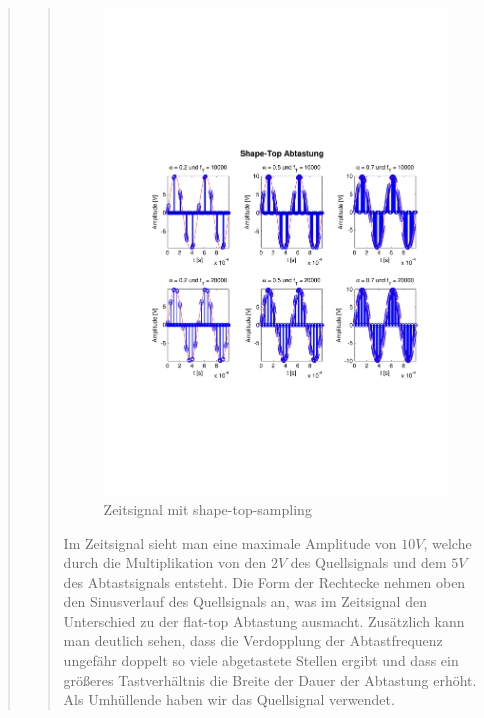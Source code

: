 \begin{quote}
\begin{quote}
         \begin{figure}[H]
        \centering
        \includegraphics[scale=0.6, trim = 1.5cm 6cm 1cm 8cm,
        clip]{./Bilder/shape-top-zeit_5V}
            \caption{Zeitsignal mit shape-top-sampling}
  	    \end{figure}
  	    
  	    Im Zeitsignal sieht man eine maximale Amplitude von $10V$, welche durch
  	    die Multiplikation von den $2V$ des Quellsignals und dem $5V$ des
  	    Abtastsignals entsteht. Die Form der Rechtecke nehmen oben den
  	    Sinusverlauf des Quellsignals an, was im Zeitsignal den Unterschied zu
  	    der flat-top Abtastung ausmacht. Zusätzlich kann man deutlich sehen, dass
  	    die Verdopplung der Abtastfrequenz ungefähr doppelt so viele abgetastete Stellen ergibt und 
  	    dass ein größeres Tastverhältnis die Breite der Dauer der Abtastung erhöht. 
  	    Als Umhüllende haben wir das Quellsignal verwendet.\\
  	    

\end{quote}
\end{quote}
